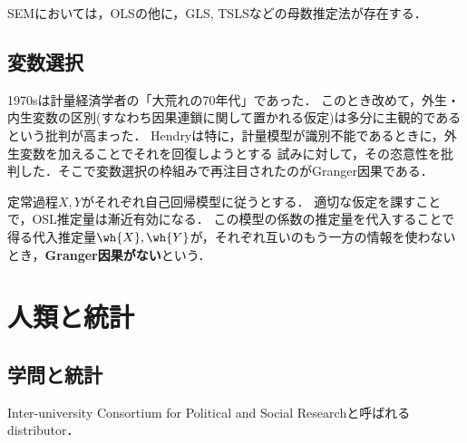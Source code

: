 \documentclass[uplatex,dvipdfmx]{jsreport}
\begin{document}
\begin{tcolorbox}[colframe=ForestGreen, colback=ForestGreen!10!white,breakable,colbacktitle=ForestGreen!40!white,coltitle=black,fonttitle=\bfseries\sffamily,
title=]
    SEMにおいては，OLSの他に，GLS, TSLSなどの母数推定法が存在する．
\end{tcolorbox}

\section{変数選択}

\begin{history}
    1970sは計量経済学者の「大荒れの70年代」\cite{Hendry-Alchemy80}であった．
    このとき改めて，外生・内生変数の区別(すなわち因果連鎖に関して置かれる仮定)は多分に主観的であるという批判が高まった．
    Hendryは特に，計量模型が識別不能であるときに，外生変数を加えることでそれを回復しようとする
    試みに対して，その恣意性を批判した．そこで変数選択の枠組みで再注目されたのがGranger因果\cite{Granger69}である\cite{統計と社会経済分析2-思想と方法}．
\end{history}

\begin{definition}
    定常過程$X,Y$がそれぞれ自己回帰模型に従うとする．
    適切な仮定を課すことで，OSL推定量は漸近有効になる．
    この模型の係数の推定量を代入することで得る代入推定量$\wh{X},\wh{Y}$が，それぞれ互いのもう一方の情報を使わないとき，\textbf{Granger因果がない}という．
\end{definition}

\chapter{人類と統計}

\section{学問と統計}

\begin{history}[ICPSR 62-]
    Inter-university Consortium for Political and Social Researchと呼ばれるdistributor．
\end{history}
\end{document}
